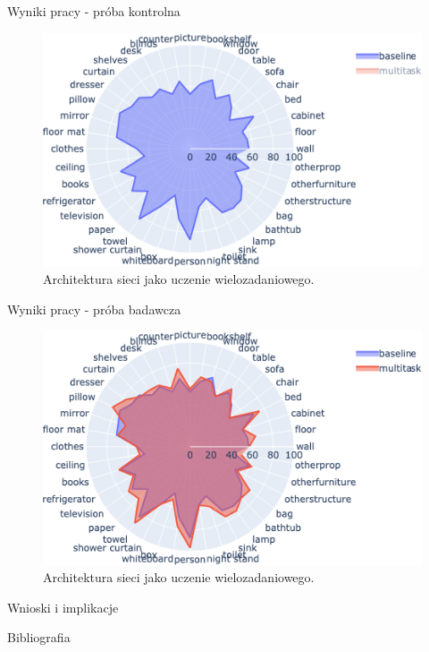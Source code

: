 \documentclass[10pt]{beamer}
\begin{document}
\begin{frame}{Wyniki pracy - próba kontrolna}
        
    \begin{figure}
        \includegraphics[width=\textwidth]{images/segmentation_polar_baseline.png}
        \caption{Architektura sieci jako uczenie wielozadaniowego.}
    \end{figure}
\end{frame}
\begin{frame}{Wyniki pracy - próba badawcza}
    \begin{figure}
        \includegraphics[width=\textwidth]{images/segmentation_polar.png}
        \caption{Architektura sieci jako uczenie wielozadaniowego.}
    \end{figure}
\end{frame}


\begin{frame}{Wnioski i implikacje}
    
\end{frame}
\begin{frame}[allowframebreaks]{Bibliografia}
    
    
    
    
\end{frame}
\end{document}

